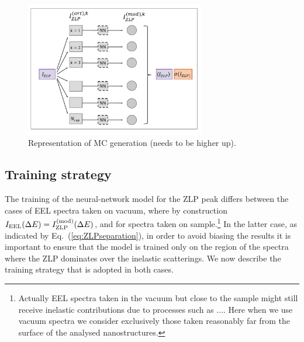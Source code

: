 \begin{figure}[t]
    \centering
    \includegraphics[width=0.7\textwidth]{plots/MCscheme.pdf}
    \caption{Representation of MC generation (needs to be higher up).}
    \label{fig:MCscheme}
\end{figure}



\subsection{Training strategy}
\label{sec:training}

The training of the neural-network model for the ZLP peak differs between
the cases of EEL spectra taken on vacuum, where by construction $I_{\rm EEL}(\Delta E) =I_{\rm ZLP}^{\rm (mod)}(\Delta E)$,
and for spectra taken on sample.\footnote{Actually EEL spectra taken in the vacuum but close
  to the sample might still receive inelastic contributions due to processes such as .... Here
  when we use vacuum spectra we consider exclusively those taken reasonably far from the surface
of the analysed nanostructures.}
%
In the latter case, as indicated by Eq.~(\ref{eq:ZLPseparation}), in order to avoid
biasing the results it is
important to ensure that the model is trained only on the region of the spectra
where the ZLP dominates over the inelastic scatterings.
%
We now describe the training strategy that is adopted in both cases.

